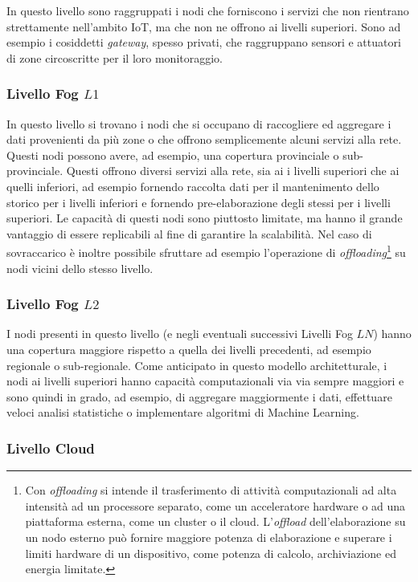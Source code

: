 In questo livello sono raggruppati i nodi che forniscono i servizi che non rientrano strettamente nell'ambito IoT, ma che non ne offrono ai livelli superiori. Sono ad esempio i cosiddetti \textit{gateway}, spesso privati, che raggruppano sensori e attuatori di zone circoscritte per il loro monitoraggio.

\subsubsection{Livello Fog $L1$}

In questo livello si trovano i nodi che si occupano di raccogliere ed aggregare i dati provenienti da più zone o che offrono semplicemente alcuni servizi alla rete. Questi nodi possono avere, ad esempio, una copertura provinciale o sub-provinciale. Questi offrono diversi servizi alla rete, sia ai i livelli superiori che ai quelli inferiori, ad esempio fornendo raccolta dati per il mantenimento dello storico per i livelli inferiori e fornendo pre-elaborazione degli stessi per i livelli superiori. Le capacità di questi nodi sono piuttosto limitate, ma hanno il grande vantaggio di essere replicabili al fine di garantire la scalabilità. Nel caso di sovraccarico è inoltre possibile sfruttare ad esempio l'operazione di \textit{offloading}\footnote{Con \textit{offloading} si intende il trasferimento di attività computazionali ad alta intensità ad un processore separato, come un acceleratore hardware o ad una piattaforma esterna, come un cluster o il cloud. L'\textit{offload} dell'elaborazione su un nodo esterno può fornire maggiore potenza di elaborazione e superare i limiti hardware di un dispositivo, come potenza di calcolo, archiviazione ed energia limitate.} su nodi vicini dello stesso livello.

\subsubsection{Livello Fog $L2$}
I nodi presenti in questo livello (e negli eventuali successivi Livelli Fog $LN$) hanno una copertura maggiore rispetto a quella dei livelli precedenti, ad esempio regionale o sub-regionale. Come anticipato in questo modello architetturale, i nodi ai livelli superiori hanno capacità computazionali via via sempre maggiori e sono quindi in grado, ad esempio,  di aggregare maggiormente i dati, effettuare veloci analisi statistiche o implementare algoritmi di Machine Learning.

\subsubsection{Livello Cloud}

